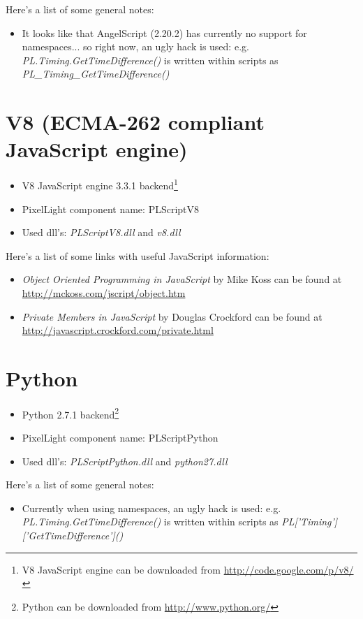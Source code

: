 Here's a list of some general notes:
\begin{itemize}
\item It looks like that AngelScript (2.20.2) has currently no support for namespaces... so right now, an ugly hack is used: e.g. \emph{PL.Timing.GetTimeDifference()} is written within scripts as \emph{PL\_Timing\_GetTimeDifference()}
\end{itemize}




\section{V8 (ECMA-262 compliant JavaScript engine)}
\begin{itemize}
\item V8 JavaScript engine 3.3.1 backend\footnote{V8 JavaScript engine can be downloaded from \url{http://code.google.com/p/v8/}}
\item PixelLight component name: PLScriptV8
\item Used dll's: \emph{PLScriptV8.dll} and \emph{v8.dll}
\end{itemize}

Here's a list of some links with useful JavaScript information:
\begin{itemize}
\item \emph{Object Oriented Programming in JavaScript} by Mike Koss  can be found at \url{http://mckoss.com/jscript/object.htm}
\item \emph{Private Members in JavaScript} by Douglas Crockford can be found at \url{http://javascript.crockford.com/private.html}
\end{itemize}




\section{Python}
\begin{itemize}
\item Python 2.7.1 backend\footnote{Python can be downloaded from \url{http://www.python.org/}}
\item PixelLight component name: PLScriptPython
\item Used dll's: \emph{PLScriptPython.dll} and \emph{python27.dll}
\end{itemize}

Here's a list of some general notes:
\begin{itemize}
\item Currently when using namespaces, an ugly hack is used: e.g. \emph{PL.Timing.GetTimeDifference()} is written within scripts as \emph{PL['Timing']['GetTimeDifference']()}
\end{itemize}
